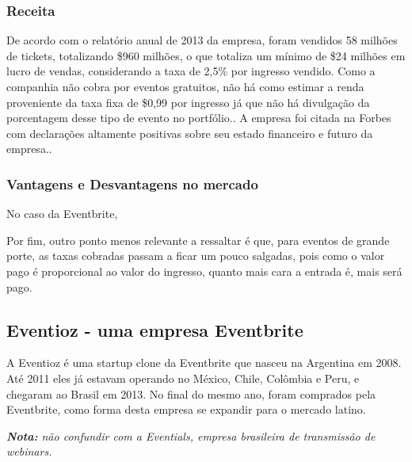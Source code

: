 \documentclass[12pt,a4paper,twoside,hyphens,english,brazil]{abntex2}
\begin{document}
\subsubsection*{Receita}
De acordo com o relatório anual de 2013 da empresa, foram vendidos 58 milhões de tickets, totalizando \$960 milhões, o que totaliza um mínimo de \$24 milhões em lucro de vendas, considerando a taxa de 2,5\% por ingresso vendido. Como a companhia não cobra por eventos gratuitos, não há como estimar a renda proveniente da taxa fixa de \$0,99 por ingresso já que não há divulgação da porcentagem desse tipo de evento no portfólio.\cite{eventbrite-lucro-tnw}. A empresa foi citada na Forbes com declarações altamente positivas sobre seu estado financeiro e futuro da empresa.\cite{eventbrite-lucro-forbes}.

\subsubsection*{Vantagens e Desvantagens no mercado}
No caso da Eventbrite, 

Por fim, outro ponto menos relevante a ressaltar é que, para eventos de grande porte, as taxas cobradas passam a ficar um pouco salgadas, pois como o valor pago é proporcional ao valor do ingresso, quanto mais cara a entrada é, mais será pago.


\subsection{Eventioz - uma empresa Eventbrite}
A Eventioz é uma startup clone da Eventbrite que nasceu na Argentina em 2008. Até 2011 eles já estavam operando no México, Chile, Colômbia e Peru, e chegaram ao Brasil em 2013. No final do mesmo ano, foram comprados pela Eventbrite, como forma desta empresa se expandir para o mercado latino.

\emph{\textbf{Nota:} não confundir com a Eventials, empresa brasileira de transmissão de webinars.}
\end{document}
